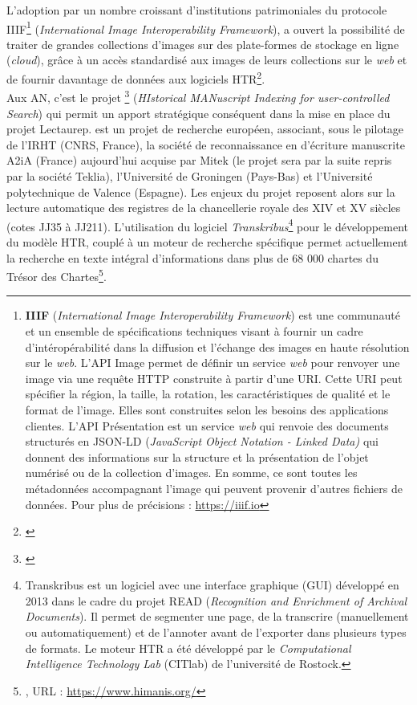 L'adoption par un nombre croissant d'institutions patrimoniales du protocole IIIF\footnote{\textbf{IIIF} (\textit{\textit{International Image Interoperability Framework}}) est une communauté et un ensemble de spécifications techniques visant à fournir un cadre d'intéropérabilité dans la diffusion et l'échange des images en haute résolution sur le \textit{web}. L'API Image permet de définir un service \textit{web} pour renvoyer une image via une requête HTTP construite à partir d'une URI. Cette URI peut spécifier la région, la taille, la rotation, les caractéristiques de qualité et le format de l'image. Elles sont construites selon les besoins des applications clientes. L'API Présentation est un service \textit{web} qui renvoie des documents structurés en JSON-LD (\textit{JavaScript Object Notation - Linked Data)} qui donnent des informations sur la structure et la présentation de l'objet numérisé ou de la collection d'images. En somme, ce sont toutes les métadonnées accompagnant l'image qui peuvent provenir d'autres fichiers de données. Pour plus de précisions : \url{https://iiif.io}} (\textit{International Image Interoperability Framework}), a ouvert la possibilité de traiter de grandes collections d'images sur des plate-formes de stockage en ligne (\textit{cloud}), grâce à un accès standardisé aux images de leurs collections sur le \textit{web} et de fournir davantage de données aux logiciels HTR\footnote{\cite{boros_automatic_2019}}.\\

Aux AN, c'est le projet \footnote{\cite{hamel_recherche_2017}} (\textit{HIstorical MANuscript Indexing for user-controlled Search}) qui permit un apport stratégique conséquent dans la mise en place du projet Lectaurep.  est un projet de recherche européen, associant, sous le pilotage de l'IRHT (CNRS, France), la société de reconnaissance en d'écriture manuscrite A2iA (France) aujourd'hui acquise par Mitek (le projet sera par la suite repris par la société Teklia), l'Université de Groningen  (Pays-Bas) et l'Université polytechnique de Valence (Espagne). Les enjeux du projet reposent alors sur la lecture automatique des registres de la chancellerie royale des XIV et XV siècles (cotes JJ35 à JJ211). L'utilisation du logiciel \textit{Transkribus}\footnote{Transkribus est un logiciel avec une interface graphique (GUI) développé en 2013 dans le cadre du projet READ (\textit{Recognition and Enrichment of Archival Documents}). Il permet de segmenter une page, de la transcrire (manuellement ou automatiquement) et de l'annoter avant de l’exporter dans plusieurs types de formats. Le moteur HTR a été développé par le \textit{Computational Intelligence Technology Lab} (CITlab) de l'université de Rostock.} pour le développement du modèle HTR, couplé à un moteur de recherche spécifique permet actuellement la recherche en texte intégral d'informations dans plus de 68 000 chartes du Trésor des Chartes\footnote{, URL : \url{https://www.himanis.org/}}. 

